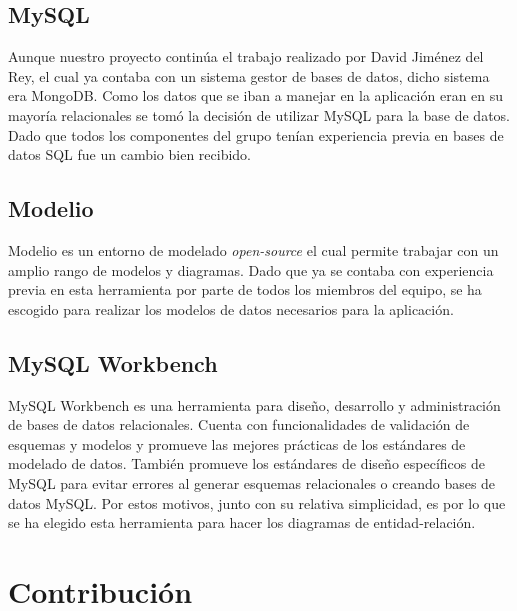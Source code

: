 \documentclass[11pt]{book}
\begin{document}
\section{MySQL}
Aunque nuestro proyecto continúa el trabajo realizado por David Jiménez del Rey, el cual ya contaba con un sistema gestor de bases de datos, dicho sistema era MongoDB. Como los datos que se iban a manejar en la aplicación eran en su mayoría relacionales se tomó la decisión de utilizar MySQL para la base de datos. Dado que todos los componentes del grupo tenían experiencia previa en bases de datos SQL fue un cambio bien recibido.

\section{Modelio}	
Modelio es un entorno de modelado \emph{open-source} el cual permite trabajar con un amplio rango de modelos y diagramas. Dado que ya se contaba con experiencia previa en esta herramienta por parte de todos los miembros del equipo, se ha escogido para realizar los modelos de datos necesarios para la aplicación.

\section{MySQL Workbench}
MySQL Workbench es una herramienta para diseño, desarrollo y administración de bases de datos relacionales. 
Cuenta con funcionalidades de validación de esquemas y modelos y promueve las mejores prácticas de los estándares de modelado de datos. También promueve los estándares de diseño específicos de MySQL para evitar errores al generar esquemas relacionales o creando bases de datos MySQL. Por estos motivos, junto con su relativa simplicidad, es por lo que se ha elegido esta herramienta para hacer los diagramas de entidad-relación.

\chapter{Contribución}
\end{document}
